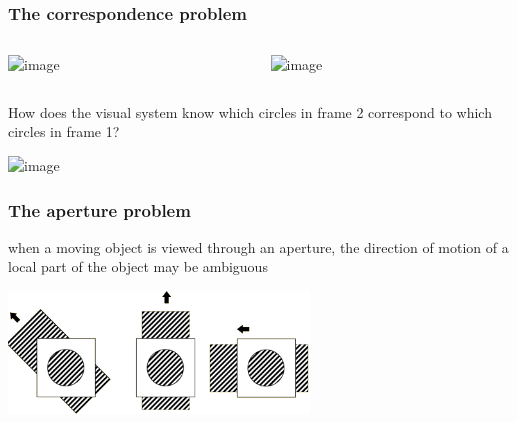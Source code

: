 \documentclass[]{beamer}
\begin{document}
\begin{frame}
 \frametitle{The correspondence problem}
\begin{overlayarea}{110mm}{80mm}
 \begin{columns}[T]
 \begin{column}{40mm}
\includegraphics<1->[width=35mm]{figs/l7/correspondence_1.png}
 \end{column}

 \begin{column}{40mm}
\includegraphics<1->[width=35mm]{figs/l7/correspondence_2.png} 
\end{column}
\end{columns}

\vspace{3mm}
How does the visual system know which circles in frame 2 correspond to which circles in frame 1?
\begin{center}
\includegraphics<2>[width=40mm]{figs/l7/correspondence_3.png} 
\end{center}
\end{overlayarea}
\end{frame}

\begin{frame}
 \frametitle{The aperture problem}
\begin{overlayarea}{120mm}{70mm}
when a moving object is viewed through an aperture, the direction of motion of a local part of the object may be ambiguous 
\begin{center}
\includegraphics[width=80mm]{figs/l7/aperture.png} 
\end{center}

\end{overlayarea}
\end{frame}
\end{document}
